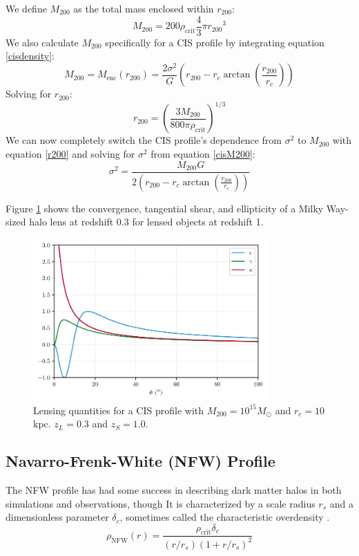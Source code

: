 \documentclass[10pt]{article}
\begin{document}
We define $M_{200}$ as the total mass enclosed within $r_{200}$:
\begin{equation}
M_{200} = 200 \rho_\mathrm{crit} \frac{4}{3} \pi {r_{200}}^3
\end{equation}
We also calculate $M_{200}$ specifically for a CIS profile by integrating equation \ref{cisdensity}:
\begin{equation} \label{cisM200}
M_{200} = M_\mathrm{enc}(r_{200}) = \frac{2 \sigma^2}{G} \left( r_{200} - r_c \arctan{\left(\frac{r_{200}}{r_c}\right)} \right)
\end{equation}
Solving for $r_{200}$:
\begin{equation} \label{r200}
r_{200} = \left( \frac{3 M_{200}}{800 \pi \rho_\mathrm{crit}} \right)^{1/3}
\end{equation}
We can now completely switch the CIS profile's dependence from $\sigma^2$ to $M_{200}$ with equation \ref{r200} and solving for $\sigma^2$ from equation \ref{cisM200}:
\begin{equation}
\sigma^2 = \frac{M_{200} G}{2 \left( r_{200} - r_c \arctan{\left(\frac{r_{200}}{r_c}\right)} \right)}
\end{equation}

Figure \ref{cisproperties} shows the convergence, tangential shear, and ellipticity of a Milky Way-sized halo lens at redshift 0.3 for lensed objects at redshift 1.

\begin{figure}
    \centering
    \includegraphics[width=0.8\textwidth]{isothermalproperties.pdf}
    \caption{Lensing quantities for a CIS profile with $M_{200} = 10^{15} M_\odot$ and $r_c = 10$ kpc. $z_L = 0.3$ and $z_S = 1.0$.}
    \label{cisproperties}
\end{figure}


\subsection{Navarro-Frenk-White (NFW) Profile}
The NFW profile has had some success in describing dark matter halos in both simulations and observations, though
\citep{Navarro1997}
It is characterized by a scale radius $r_s$ and a dimensionless parameter $\delta_c$, sometimes called the characteristic overdensity \citep{Wright2000}.
\begin{equation}
\rho_\mathrm{NFW}(r) = \frac{\rho_\mathrm{crit} \delta_c}{(r/r_s)\left(1 + r/r_s\right)^2}
\end{equation}
\end{document}
